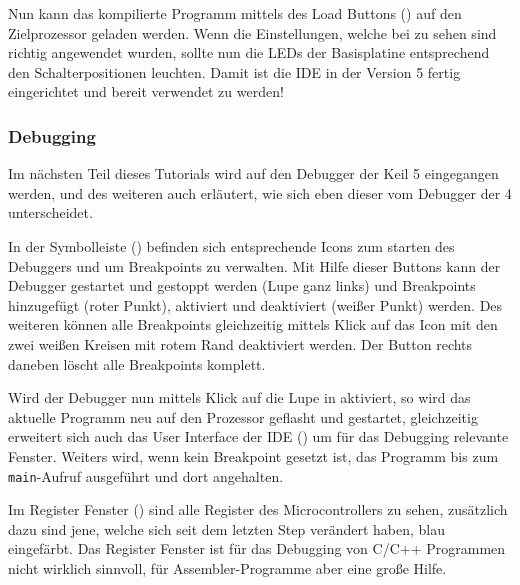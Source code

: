 
Nun kann das kompilierte Programm mittels des Load Buttons () auf den Zielprozessor geladen werden. Wenn die Einstellungen, welche bei  zu sehen sind richtig angewendet wurden, sollte nun die LEDs der \gls{Basisplatine} entsprechend den Schalterpositionen leuchten. Damit ist die \uVision{} \gls{IDE} in der Version 5 fertig eingerichtet und bereit verwendet zu werden!

\subsubsection{Debugging}
\label{sec:tut-debugging}
Im nächsten Teil dieses Tutorials wird auf den Debugger der \gls{Keil} \uVision{} 5 eingegangen werden, und des weiteren auch erläutert, wie sich eben dieser vom Debugger der \uVision{} 4 unterscheidet.

In der Symbolleiste () befinden sich entsprechende Icons zum starten des Debuggers und um Breakpoints zu verwalten. Mit Hilfe dieser Buttons kann der Debugger gestartet und gestoppt werden (Lupe ganz links) und Breakpoints hinzugefügt (roter Punkt), aktiviert und deaktiviert (weißer Punkt) werden. Des weiteren können alle Breakpoints gleichzeitig mittels Klick auf das Icon mit den zwei weißen Kreisen mit rotem Rand deaktiviert werden. Der Button rechts daneben löscht alle Breakpoints komplett.


Wird der Debugger nun mittels Klick auf die Lupe in  aktiviert, so wird das aktuelle Programm neu auf den Prozessor geflasht und gestartet, gleichzeitig erweitert sich auch das User Interface der \gls{IDE} () um für das \gls{Debugging} relevante Fenster. Weiters wird, wenn kein Breakpoint gesetzt ist, das Programm bis zum \texttt{main}-Aufruf ausgeführt und dort angehalten.


Im Register Fenster () sind alle Register des Microcontrollers zu sehen, zusätzlich dazu sind jene, welche sich seit dem letzten Step verändert haben, blau eingefärbt. Das Register Fenster ist für das \gls{Debugging} von \gls{C}/\gls{C++} Programmen nicht wirklich sinnvoll, für Assembler-Programme aber eine große Hilfe.

